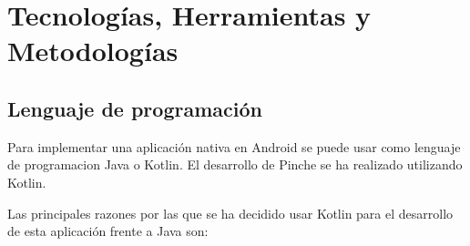 \cleardoublepage
\chapter{Tecnologías, Herramientas y Metodologías}




\section{Lenguaje de programación}

Para implementar una aplicación nativa en Android se puede usar como lenguaje de programacion Java o Kotlin.
El desarrollo de Pinche se ha realizado utilizando Kotlin.

Las principales razones por las que se ha decidido usar Kotlin para el desarrollo de esta aplicación frente a Java son:

